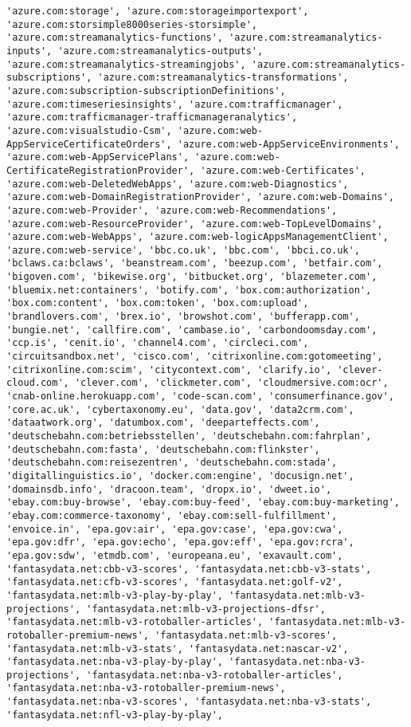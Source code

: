 \documentclass[11pt]{article}
\begin{document}
\begin{Verbatim}[commandchars=\\\{\}]
'azure.com:storage', 'azure.com:storageimportexport', 'azure.com:storsimple8000series-storsimple', 'azure.com:streamanalytics-functions', 'azure.com:streamanalytics-inputs', 'azure.com:streamanalytics-outputs', 'azure.com:streamanalytics-streamingjobs', 'azure.com:streamanalytics-subscriptions', 'azure.com:streamanalytics-transformations', 'azure.com:subscription-subscriptionDefinitions', 'azure.com:timeseriesinsights', 'azure.com:trafficmanager', 'azure.com:trafficmanager-trafficmanageranalytics', 'azure.com:visualstudio-Csm', 'azure.com:web-AppServiceCertificateOrders', 'azure.com:web-AppServiceEnvironments', 'azure.com:web-AppServicePlans', 'azure.com:web-CertificateRegistrationProvider', 'azure.com:web-Certificates', 'azure.com:web-DeletedWebApps', 'azure.com:web-Diagnostics', 'azure.com:web-DomainRegistrationProvider', 'azure.com:web-Domains', 'azure.com:web-Provider', 'azure.com:web-Recommendations', 'azure.com:web-ResourceProvider', 'azure.com:web-TopLevelDomains', 'azure.com:web-WebApps', 'azure.com:web-logicAppsManagementClient', 'azure.com:web-service', 'bbc.co.uk', 'bbc.com', 'bbci.co.uk', 'bclaws.ca:bclaws', 'beanstream.com', 'beezup.com', 'betfair.com', 'bigoven.com', 'bikewise.org', 'bitbucket.org', 'blazemeter.com', 'bluemix.net:containers', 'botify.com', 'box.com:authorization', 'box.com:content', 'box.com:token', 'box.com:upload', 'brandlovers.com', 'brex.io', 'browshot.com', 'bufferapp.com', 'bungie.net', 'callfire.com', 'cambase.io', 'carbondoomsday.com', 'ccp.is', 'cenit.io', 'channel4.com', 'circleci.com', 'circuitsandbox.net', 'cisco.com', 'citrixonline.com:gotomeeting', 'citrixonline.com:scim', 'citycontext.com', 'clarify.io', 'clever-cloud.com', 'clever.com', 'clickmeter.com', 'cloudmersive.com:ocr', 'cnab-online.herokuapp.com', 'code-scan.com', 'consumerfinance.gov', 'core.ac.uk', 'cybertaxonomy.eu', 'data.gov', 'data2crm.com', 'dataatwork.org', 'datumbox.com', 'deeparteffects.com', 'deutschebahn.com:betriebsstellen', 'deutschebahn.com:fahrplan', 'deutschebahn.com:fasta', 'deutschebahn.com:flinkster', 'deutschebahn.com:reisezentren', 'deutschebahn.com:stada', 'digitallinguistics.io', 'docker.com:engine', 'docusign.net', 'domainsdb.info', 'dracoon.team', 'dropx.io', 'dweet.io', 'ebay.com:buy-browse', 'ebay.com:buy-feed', 'ebay.com:buy-marketing', 'ebay.com:commerce-taxonomy', 'ebay.com:sell-fulfillment', 'envoice.in', 'epa.gov:air', 'epa.gov:case', 'epa.gov:cwa', 'epa.gov:dfr', 'epa.gov:echo', 'epa.gov:eff', 'epa.gov:rcra', 'epa.gov:sdw', 'etmdb.com', 'europeana.eu', 'exavault.com', 'fantasydata.net:cbb-v3-scores', 'fantasydata.net:cbb-v3-stats', 'fantasydata.net:cfb-v3-scores', 'fantasydata.net:golf-v2', 'fantasydata.net:mlb-v3-play-by-play', 'fantasydata.net:mlb-v3-projections', 'fantasydata.net:mlb-v3-projections-dfsr', 'fantasydata.net:mlb-v3-rotoballer-articles', 'fantasydata.net:mlb-v3-rotoballer-premium-news', 'fantasydata.net:mlb-v3-scores', 'fantasydata.net:mlb-v3-stats', 'fantasydata.net:nascar-v2', 'fantasydata.net:nba-v3-play-by-play', 'fantasydata.net:nba-v3-projections', 'fantasydata.net:nba-v3-rotoballer-articles', 'fantasydata.net:nba-v3-rotoballer-premium-news', 'fantasydata.net:nba-v3-scores', 'fantasydata.net:nba-v3-stats', 'fantasydata.net:nfl-v3-play-by-play', 
\end{Verbatim}
\end{document}
